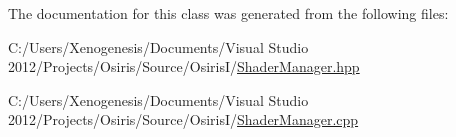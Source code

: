 The documentation for this class was generated from the following files\-:\begin{DoxyCompactItemize}
\item 
C\-:/\-Users/\-Xenogenesis/\-Documents/\-Visual Studio 2012/\-Projects/\-Osiris/\-Source/\-Osiris\-I/\hyperlink{_shader_manager_8hpp}{Shader\-Manager.\-hpp}\item 
C\-:/\-Users/\-Xenogenesis/\-Documents/\-Visual Studio 2012/\-Projects/\-Osiris/\-Source/\-Osiris\-I/\hyperlink{_shader_manager_8cpp}{Shader\-Manager.\-cpp}\end{DoxyCompactItemize}
